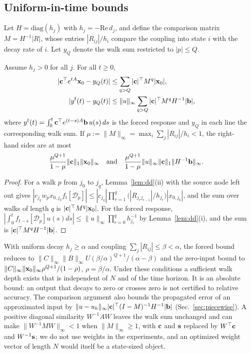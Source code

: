\subsection{Uniform-in-time bounds}
Let $H=\mathrm{diag}(h_j)$ with $h_j=-\mathrm{Re}\,d_j$, and define the comparison matrix $M=H^{-1}|R|$, whose entries $|R_{ij}|/h_i$ compare the coupling into state $i$ with the decay rate of $i$. Let $y_Q$ denote the walk sum restricted to $|p|\le Q$.
\begin{theorem}\label{thm:uniform}
Assume $h_j>0$ for all $j$. For all $t\ge0$,
\begin{align}
|{\bf c}^\top e^{tA}{\bf x}_0-y_Q(t)|&\le\sum_{q>Q}|{\bf c}|^\top M^q|{\bf x}_0|,\label{eq:uni_zi}\\
|y^{\rm f}(t)-y_Q(t)|&\le\|u\|_\infty\sum_{q>Q}|{\bf c}|^\top M^qH^{-1}|{\bf b}|,\label{eq:uni_f}
\end{align}
where $y^{\rm f}(t)=\int_0^t{\bf c}^\top e^{(t-s)A}{\bf b}\,u(s)\,ds$ is the forced response and $y_Q$ in each line the corresponding walk sum.
If $\mu:=\|M\|_\infty=\max_i\sum_j|R_{ij}|/h_i<1$, the right-hand sides are at most
\begin{equation*}
\frac{\mu^{Q+1}}{1-\mu}\|{\bf c}\|_1\|{\bf x}_0\|_\infty\quad\text{and}\quad\frac{\mu^{Q+1}}{1-\mu}\|u\|_\infty\|{\bf c}\|_1\|H^{-1}{\bf b}\|_\infty .
\end{equation*}
\end{theorem}
\begin{proof}
For a walk $p$ from $j_0$ to $j_q$, Lemma~\ref{lem:dd}(ii) with the source node left out gives $|c_{j_q}w_px_{0,j_0}f_t[\mathcal{D}_p]|\le|c_{j_q}|\prod_{r=1}^{q}\big(|R_{j_rj_{r-1}}|/h_{j_r}\big)|x_{0,j_0}|$, and the sum over walks of length $q$ is $|{\bf c}|^\top M^q|{\bf x}_0|$. For the forced response, $|\int_0^tf_{t-s}[\mathcal{D}_p]u(s)ds|\le\|u\|_\infty\prod_{r=0}^qh_{j_r}^{-1}$ by Lemma~\ref{lem:dd}(i), and the sum is $|{\bf c}|^\top M^qH^{-1}|{\bf b}|$.
\end{proof}
With uniform decay $h_j\ge\alpha$ and coupling $\sum_j|R_{ij}|\le\beta<\alpha$, the forced bound reduces to $\|C\|_\infty\|B\|_\infty U(\beta/\alpha)^{Q+1}/(\alpha-\beta)$ and the zero-input bound to $\|C\|_\infty\|{\bf x}_0\|_\infty\rho^{Q+1}/(1-\rho)$, $\rho=\beta/\alpha$. Under these conditions a sufficient walk depth exists that is independent of $N$ and of the time horizon. It is an absolute bound: an output that decays to zero or crosses zero is not certified to relative accuracy. The comparison argument also bounds the propagated error of an approximated input by $\|u-u_h\|_\infty|{\bf c}|^\top(I-M)^{-1}H^{-1}|{\bf b}|$ (Sec.~\ref{sec:piecewise}). A positive diagonal similarity $W^{-1}AW$ leaves the walk sum unchanged and can make $\|W^{-1}MW\|_\infty<1$ when $\|M\|_\infty\ge1$, with ${\bf c}$ and ${\bf s}$ replaced by $W^\top{\bf c}$ and $W^{-1}{\bf s}$; we do not use weights in the experiments, and an optimized weight vector of length $N$ would itself be a state-sized object.

